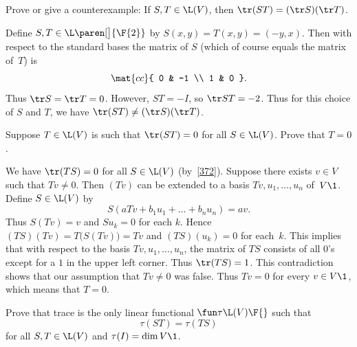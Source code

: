 \exercise
Prove or give a counterexample: If $S, T \in \L(V)$, then
$
\tr (ST) = (\tr S) (\tr T)$.

\begin{Solution}
Define $S, T \in \L\paren[\big]{\F{2}}$ by $S(x, y) = T(x, y) = (-y, x)$.  Then with
respect to the standard bases the matrix of
$S$ (which of course equals the matrix of~$T$) is
\[
\mat{cc}{
0 & -1 \\
1 & 0 }.
\]
Thus $\tr S = \tr T = 0$.  However, $ST = -I$, so $\tr ST = -2$.  Thus for this
choice of $S$ and $T$, we have $\tr (ST) \ne (\tr S) (\tr T)$.
\end{Solution}

\exercise
Suppose $T \in \L(V)$ is such that $\tr(ST) = 0$ for all $S \in \L(V)$. Prove that $T = 0$.

\begin{Solution}
We have $\tr(TS) = 0$ for all
$S \in \L(V)$ (by~\ref{372}).  Suppose there exists $v \in V$ such that
$Tv \ne 0$.  Then $(Tv)$ can be extended to a basis $Tv, u_1, \dots, u_n$
of~$V\1$.  Define $S \in \L(V)$ by
\[
S(aTv + b_1 u_1 + \dots + b_n u_n) = av.
\]
Thus $S(Tv) = v$ and $Su_k = 0$ for each $k$.  Hence $(TS)(Tv) = T\bigl(S(Tv)\bigr) = Tv$ and
$(TS)(u_k) = 0$ for each~$k$.  This implies that with
respect to the basis $Tv, u_1, \dots, u_n$, the matrix of $TS$  consists of all
$0$'s except for a $1$ in the upper left corner.  Thus
$\tr(TS) = 1$.  This contradiction shows that our assumption that $Tv \ne 0$ was false.  Thus $Tv = 0$ for every $v \in V\1$, which means that $T = 0$.
\end{Solution}

\exercise
Prove that trace is the only linear functional $\fun \tau {\L(V)} {\F{}}$ such that\label{9trChar}
\[
\tau(ST) = \tau(TS)\]
for all $S, T \in \L(V)$ and $\tau(I) = \dim V\1$.


